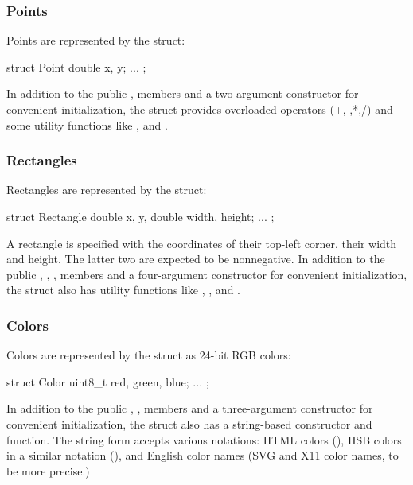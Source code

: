 \subsubsection{Points}
\label{sec:graphics:canvas-points}

Points are represented by the  struct:

\begin{cpp}
struct Point {
    double x, y;
    ...
};
\end{cpp}

In addition to the public ,  members and a two-argument
constructor for convenient initialization, the struct provides overloaded
operators (+,-,*,/) and some utility functions like ,
 and .

\subsubsection{Rectangles}
\label{sec:graphics:canvas-rectangles}

Rectangles are represented by the  struct:

\begin{cpp}
struct Rectangle {
    double x, y,
    double width, height;
    ...
};
\end{cpp}

A rectangle is specified with the coordinates of their top-left corner,
their width and height. The latter two are expected to be nonnegative. In
addition to the public , , ,  members
and a four-argument constructor for convenient initialization, the struct
also has utility functions like , ,
 and .

\subsubsection{Colors}
\label{sec:graphics:canvas-colors}

Colors are represented by the  struct as 24-bit RGB colors:

\begin{cpp}
struct Color {
    uint8_t red, green, blue;
    ...
};
\end{cpp}

In addition to the public , ,  members
and a three-argument constructor for convenient initialization, the struct
also has a string-based constructor and  function.
The string form accepts various notations: HTML colors (),
HSB colors in a similar notation (), and English color names
(SVG and X11 color names, to be more precise.)

